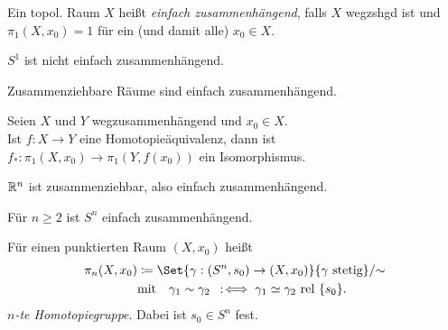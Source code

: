 \documentclass{cheat-sheet}
\newcommand{\rel}{\text{ rel }} %
\begin{document}
\begin{defn}
  Ein topol. Raum $X$ heißt \emph{einfach zusammenhängend}, falls $X$ wegzshgd ist und $\pi_1(X, x_0) = 1$ für ein (und damit alle) $x_0 \in X$.
\end{defn}

\begin{bsp}
  $S^1$ ist nicht einfach zusammenhängend.
\end{bsp}

\begin{prop}
  Zusammenziehbare Räume sind einfach zusammenhängend.
\end{prop}


\begin{prop}
  Seien $X$ und $Y$ wegzusammenhängend und $x_0 \in X$. \\
  Ist $f : X \to Y$ eine Homotopieäquivalenz, dann ist $f_* : \pi_1(X, x_0) \to \pi_1(Y, f(x_0))$ ein Isomorphismus.
\end{prop}

\begin{bsp}
  $\mathbb{R}^n$ ist zusammenziehbar, also einfach zusammenhängend.
\end{bsp}

\begin{prop}
  Für $n \geq 2$ ist $S^n$ einfach zusammenhängend.
\end{prop}

\begin{defn}
  Für einen punktierten Raum $(X, x_0)$ heißt
  \begin{align*}
    \pi_n(X, x_0) &\coloneqq \Set{ \gamma : (S^n, s_0) \to (X, x_0) }{ \gamma \text{ stetig}} / {\sim}\\
    & \text{mit} \quad \gamma_1 \sim \gamma_2 \coloniff \gamma_1 \simeq \gamma_2 \rel \{ s_0 \}.
  \end{align*}
  \emph{$n$-te Homotopiegruppe}. Dabei ist $s_0 \in S^n$ fest.
\end{defn}
\end{document}
